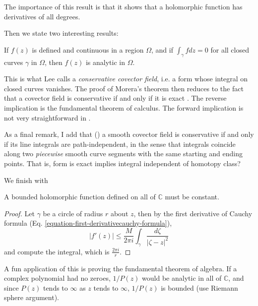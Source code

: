 \noindent
The importance of this result is that it shows that a holomorphic function has
derivatives of all degrees.

Then we state two interesting results:

\begin{theorem}[Morera]
\label{theorem-Morera}
\begin{reference}
\cite[p. 122]{ahl}
\end{reference}
If $f(z)$ is defined and continuous in a region $\Omega$, and if 
$\int_\gamma fdz=0$ for all closed curves $\gamma$ in $\Omega$, then $f(z)$ is
analytic in $\Omega$.
\end{theorem}

\noindent
This is what Lee calls a {\it conservative covector field}, i.e. a form whose
integral on closed curves vanishes. The proof of Morera's theorem then reduces
to the fact that a covector field is conservative if and only if it is exact
\cite[Theorem 11.42]{les}. The reverse implication is the fundamental theorem of
calculus. The forward implication is not very straightforward in \cite{les}.

As a final remark, I add that (\cite[Propoistion 11.40]{les}) a smooth covector
field is conservative if and only if its line integrals are path-independent, in
the sense that integrals coincide along two {\it piecewise} smooth curve
segments with the same starting and ending points. That is, form is exact
implies integral independent of homotopy class?

We finish with

\begin{theorem}[Liouville]
\label{theorem-Liouville}
A bounded holomorphic function defined on all of $\mathbb{C}$ must be constant.
\end{theorem}

\begin{proof}
Let $\gamma$ be a circle of radius $r$ about $z$, then by the first derivative
of Cauchy formula (Eq. \ref{equation-first-derivativecauchy-formula}),
$$
|f'(z)|\leq \frac{M}{2\pi i}\int_\gamma \frac{d\zeta}{|\zeta-z|^2}
$$
and compute the integral, which is $\frac{2\pi i}{r}$.
\end{proof}

\noindent
A fun application of this is proving the fundamental theorem of algebra. If a
complex polynomial had no zeroes, $1/P(z)$ would be analytic in all of
$\mathbb{C}$, and since $P(z)$ tends to $\infty$ as $z$ tends to $\infty$,
$1/P(z)$ is bounded (use Riemann sphere argument).

